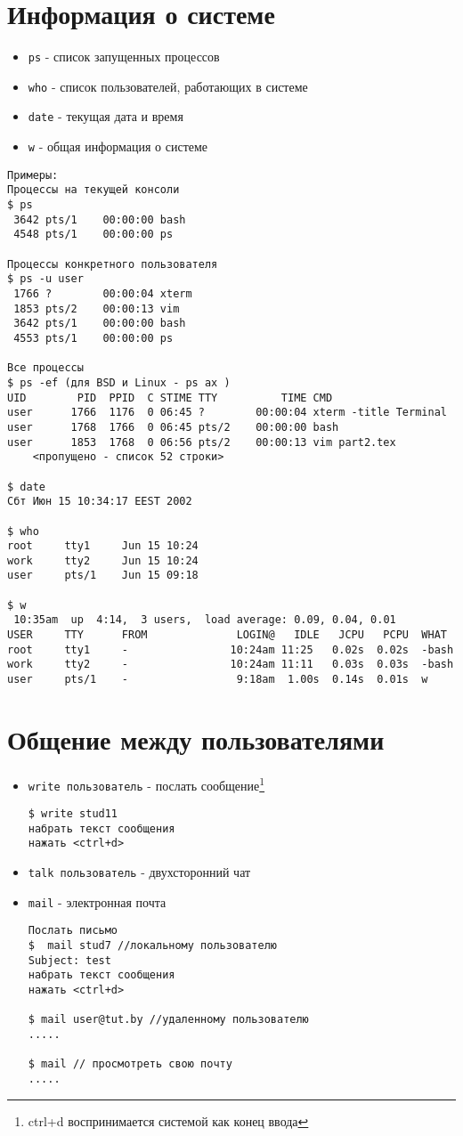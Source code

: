 \section{Информация о системе}

\begin{itemize}
\item \verb+ps+ - список запущенных процессов
\item \verb+who+ - список пользователей, работающих в системе 
\item \verb+date+ - текущая дата и время
\item \verb+w+ - общая информация о системе
\end{itemize}
\begin{verbatim}
Примеры:
Процессы на текущей консоли
$ ps
 3642 pts/1    00:00:00 bash
 4548 pts/1    00:00:00 ps

Процессы конкретного пользователя
$ ps -u user
 1766 ?        00:00:04 xterm
 1853 pts/2    00:00:13 vim
 3642 pts/1    00:00:00 bash
 4553 pts/1    00:00:00 ps

Все процессы
$ ps -ef (для BSD и Linux - ps ax )
UID        PID  PPID  C STIME TTY          TIME CMD
user      1766  1176  0 06:45 ?        00:00:04 xterm -title Terminal
user      1768  1766  0 06:45 pts/2    00:00:00 bash
user      1853  1768  0 06:56 pts/2    00:00:13 vim part2.tex
	<пропущено - список 52 строки>

$ date
Сбт Июн 15 10:34:17 EEST 2002

$ who
root     tty1     Jun 15 10:24
work     tty2     Jun 15 10:24
user     pts/1    Jun 15 09:18

$ w
 10:35am  up  4:14,  3 users,  load average: 0.09, 0.04, 0.01
USER     TTY      FROM              LOGIN@   IDLE   JCPU   PCPU  WHAT
root     tty1     -                10:24am 11:25   0.02s  0.02s  -bash 
work     tty2     -                10:24am 11:11   0.03s  0.03s  -bash 
user     pts/1    -                 9:18am  1.00s  0.14s  0.01s  w 
\end{verbatim}

\section{Общение между пользователями}
\begin{itemize}
\item \verb+write пользователь+ - послать сообщение\footnote{ ctrl+d воспринимается системой как конец ввода}
\begin{verbatim}
$ write stud11
набрать текст сообщения
нажать <ctrl+d>
\end{verbatim}
\item \verb+talk пользователь+ - двухсторонний чат 
\item \verb+mail+ - электронная почта
\begin{verbatim}
Послать письмо
$  mail stud7 //локальному пользователю
Subject: test
набрать текст сообщения
нажать <ctrl+d>

$ mail user@tut.by //удаленному пользователю
.....

$ mail // просмотреть свою почту
.....
\end{verbatim}
\end{itemize}

